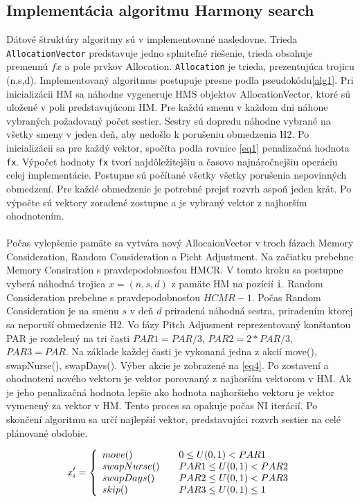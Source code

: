 \documentclass[a4paper, 14pt]{article}
\begin{document}
\subsection{Implementácia algoritmu Harmony search}
Dátové štruktúry algoritmy sú v implementované nasledovne. Trieda \texttt{AllocationVector} predstavuje jedno splniteľné riešenie, trieda obsahuje premennú $fx$ a pole prvkov Allocation. \texttt{Allocation} je trieda, prezentujúca trojicu (n,s,d).
Implementovaný algoritmus postupuje presne podla pseudokódu\ref{alg1}. Pri inicializácii HM sa náhodne vygeneruje HMS objektov AllocationVector, ktoré sú uložené v poli predstavujúcom HM. Pre každú smenu v každom dni náhone vybraných požadovaný počet sestier. Sestry sú dopredu náhodne vybrané na všetky smeny v jeden deň, aby nedošlo k porušeniu obmedzenia H2. Po inicializácii sa pre každý vektor, spočíta podla rovnice \ref{eq1} penalizačná hodnota \texttt{fx}. Výpočet hodnoty \texttt{fx} tvorí najdôležitejšiu a časovo najnáročnejšiu operáciu celej implementácie. Postupne sú počítané všetky všetky porušenia nepovinných obmedzení. Pre každé obmedzenie je potrebné prejsť rozvrh aspoň jeden krát. Po výpočte sú vektory zoradené zostupne a je vybraný vektor z najhorším ohodnotením.\\
\\
Počas vylepšenie pamäte sa vytvára nový AllocaionVector v troch fázach Memory Consideration, Random Consideration a Picht Adjustment. Na začiatku prebehne Memory Consiration s pravdepodobnosťou HMCR. V tomto kroku sa postupne vyberá náhodná trojica $x = (n,s,d)$ z pamäte HM na pozícií \texttt{i}. Random Consideration prebehne s pravdepodobnosťou $HCMR - 1$. Počas Random Consideration je na smenu $s$ v deň $d$ priradená náhodná sestra, priradením ktorej sa neporuší obmedzenie H2. Vo fázy Pitch Adjusment reprezentovaný konštantou PAR je rozdelený na tri časti $PAR1 = PAR/3$, $PAR2 = 2*PAR/3$, $PAR3 = PAR$.  Na základe každej časti je vykonaná jedna z akcií move(), swapNurse(), swapDays(). Výber akcie je zobrazené na \ref{eq4}. Po zostavení a ohodnotení nového vektoru je vektor porovnaný z najhorším vektorom v HM. Ak je jeho penalizačná hodnota lepšie ako hodnota najhoršieho vektoru je vektor vymenený za vektor v HM. Tento proces sa opakuje počas NI iterácií. Po skončení algoritmu sa určí najlepšií vektor, predstavujúci rozvrh sestier na celé plánované obdobie. 
\begin{center}
\begin{eqnarray}[ht]
\label{eq4}
x'_i = \left\{ 
\begin{array}{l l}
  move() & \quad \mbox  {$0  \leq U(0,1) < PAR1$}\\
  swapNurse() & \quad \mbox{$PAR1 \leq U(0,1) < PAR2$}\\
  swapDays() & \quad \mbox{$PAR2 \leq U(0,1) < PAR3$}\\
  skip() & \quad \mbox{$PAR3 \leq U(0,1) \leq 1$}\\
\end{array} \right. 
\end{eqnarray}
\end{center}  
\end{document}
